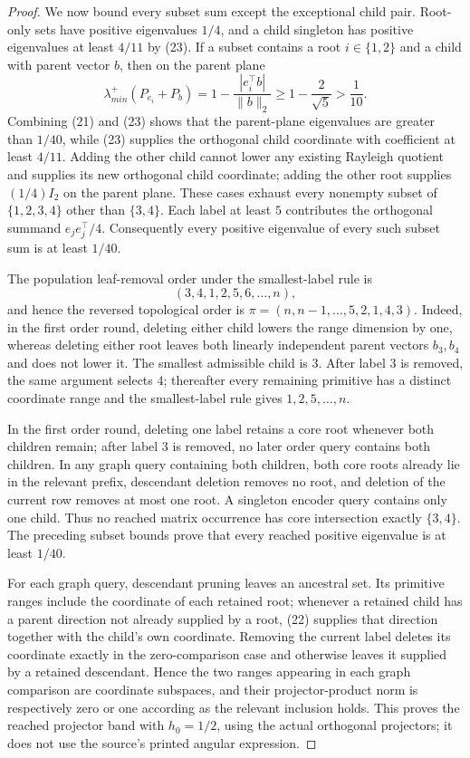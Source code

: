 \documentclass{article}
\begin{document}
\begin{proof}
We now bound every subset sum except the exceptional child pair.  Root-only sets have positive eigenvalues \(1/4\), and a child singleton has positive eigenvalues at least \(4/11\) by (23).  If a subset contains a root \(i\in\{1,2\}\) and a child with parent vector \(b\), then on the parent plane
\[
 \lambda_{min}^{+}(P_{e_i}+P_b)
 =1-\frac{|e_i^{\top}b|}{\|b\|_2}
 \ge1-\frac2{\sqrt5}>\frac1{10}.
\]
Combining (21) and (23) shows that the parent-plane eigenvalues are greater than \(1/40\), while (23) supplies the orthogonal child coordinate with coefficient at least \(4/11\).  Adding the other child cannot lower any existing Rayleigh quotient and supplies its new orthogonal child coordinate; adding the other root supplies \((1/4)I_2\) on the parent plane.  These cases exhaust every nonempty subset of \(\{1,2,3,4\}\) other than \(\{3,4\}\).  Each label at least \(5\) contributes the orthogonal summand \(e_je_j^{\top}/4\).  Consequently every positive eigenvalue of every such subset sum is at least \(1/40\).

The population leaf-removal order under the smallest-label rule is
\[
 (3,4,1,2,5,6,\ldots,n),
\]
and hence the reversed topological order is \(\pi=(n,n-1,\ldots,5,2,1,4,3)\).  Indeed, in the first order round, deleting either child lowers the range dimension by one, whereas deleting either root leaves both linearly independent parent vectors \(b_3,b_4\) and does not lower it.  The smallest admissible child is \(3\).  After label \(3\) is removed, the same argument selects \(4\); thereafter every remaining primitive has a distinct coordinate range and the smallest-label rule gives \(1,2,5,\ldots,n\).

In the first order round, deleting one label retains a core root whenever both children remain; after label \(3\) is removed, no later order query contains both children.  In any graph query containing both children, both core roots already lie in the relevant prefix, descendant deletion removes no root, and deletion of the current row removes at most one root.  A singleton encoder query contains only one child.  Thus no reached matrix occurrence has core intersection exactly \(\{3,4\}\).  The preceding subset bounds prove that every reached positive eigenvalue is at least \(1/40\).

For each graph query, descendant pruning leaves an ancestral set.  Its primitive ranges include the coordinate of each retained root; whenever a retained child has a parent direction not already supplied by a root, (22) supplies that direction together with the child's own coordinate.  Removing the current label deletes its coordinate exactly in the zero-comparison case and otherwise leaves it supplied by a retained descendant.  Hence the two ranges appearing in each graph comparison are coordinate subspaces, and their projector-product norm is respectively zero or one according as the relevant inclusion holds.  This proves the reached projector band with \(h_0=1/2\), using the actual orthogonal projectors; it does not use the source's printed angular expression.


\end{proof}
\end{document}
